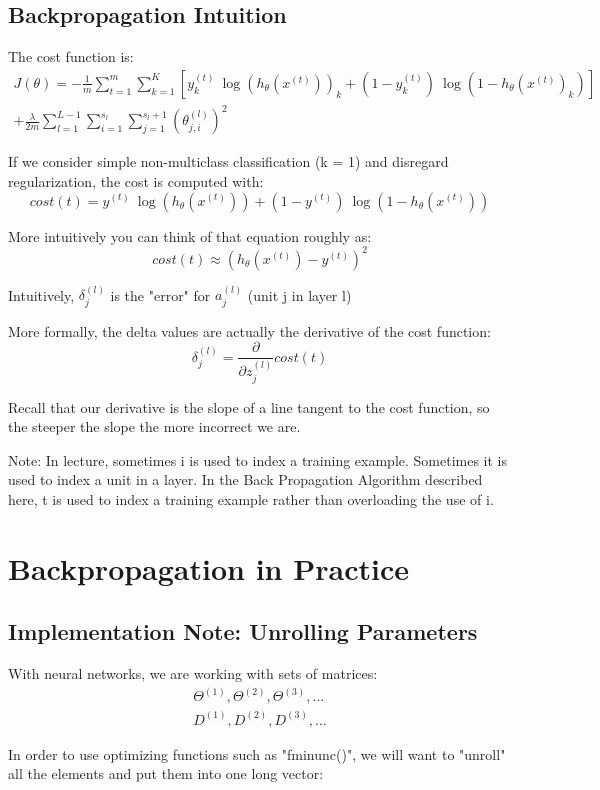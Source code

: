 \documentclass{article}
\begin{document}
\subsection{Backpropagation Intuition}
The cost function is:
\begin{gather*}
	J(\theta) = - \frac{1}{m} \sum_{t=1}^m\sum_{k=1}^K  \left[ y^{(t)}_k \ \log (h_\theta (x^{(t)}))_k + (1 - y^{(t)}_k)\ \log (1 - h_\theta(x^{(t)})_k)\right] \\
	+ \frac{\lambda}{2m}\sum_{l=1}^{L-1} \sum_{i=1}^{s_l} \sum_{j=1}^{s_l+1} ( \theta_{j,i}^{(l)})^2
\end{gather*}

If we consider simple non-multiclass classification (k = 1) and disregard regularization, the cost is computed with:
$$cost(t) =y^{(t)} \ \log (h_\theta (x^{(t)})) + (1 - y^{(t)})\ \log (1 - h_\theta(x^{(t)}))$$

More intuitively you can think of that equation roughly as:
$$cost(t) \approx (h_\theta(x^{(t)})-y^{(t)})^2$$

Intuitively, $\delta_j^{(l)}$ is the "error" for $a^{(l)}_j$ (unit j in layer l)

More formally, the delta values are actually the derivative of the cost function:
$$\delta_j^{(l)} = \dfrac{\partial}{\partial z_j^{(l)}} cost(t)$$

Recall that our derivative is the slope of a line tangent to the cost function, so the steeper the slope the more incorrect we are.

Note: In lecture, sometimes i is used to index a training example. Sometimes it is used to index a unit in a layer. In the Back Propagation Algorithm described here, t is used to index a training example rather than overloading the use of i.

\section{Backpropagation in Practice}
\subsection{Implementation Note: Unrolling Parameters}
With neural networks, we are working with sets of matrices:
\begin{align*}
	\Theta^{(1)}, \Theta^{(2)}, \Theta^{(3)}, \dots \\
	D^{(1)}, D^{(2)}, D^{(3)}, \dots
\end{align*}

In order to use optimizing functions such as "fminunc()", we will want to "unroll" all the elements and put them into one long vector:
\end{document}
